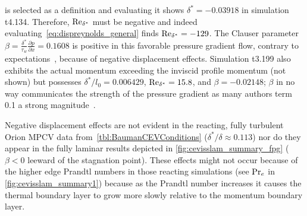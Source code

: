 is selected as a definition and evaluating it shows
$\delta^\ast = -0.03918$ in simulation t4.134.
%
Therefore, $\Reynolds[\delta^\ast]$ must be negative and indeed
evaluating~\eqref{eq:dispreynolds_general} finds $\Reynolds[\delta^\ast] =
-129$.
%
The Clauser parameter $\beta=\frac{\delta^\ast}{\tau_w} \frac{\partial
p}{\partial x}=0.1608$ is positive in this favorable pressure gradient flow,
contrary to expectations~\citep[e.g.][]{Bowersox1996Turbulence}, because of
negative displacement effects.
%
Simulation t3.199 also exhibits the actual momentum exceeding the inviscid
profile momentum (not shown) but possesses $\delta^\ast/l_0=0.006429$,
$\Reynolds[\delta^\ast]=15.8$, and $\beta=-0.02148$;  $\beta$
in no way communicates the strength of the pressure gradient as many
authors term 0.1 a strong magnitude~\citep{Smith1994Effects,Luker2000Influence}.

Negative displacement effects are not evident in the reacting, fully
turbulent Orion MPCV data from~\autoref{tbl:BaumanCEVConditions}
($\delta^\ast/\delta\approx 0.113$) nor do they appear in the fully
laminar results depicted in \autoref{fig:cevisslam_summary_fpg} ($\beta<0$
leeward of the stagnation point).  These effects might not occur because
of the higher edge Prandtl numbers in those reacting simulations (see
$\Prandtl[e]$ in \autoref{fig:cevisslam_summary1}) because as the Prandtl number
increases it causes the thermal boundary layer to grow more slowly relative to
the momentum boundary layer.

